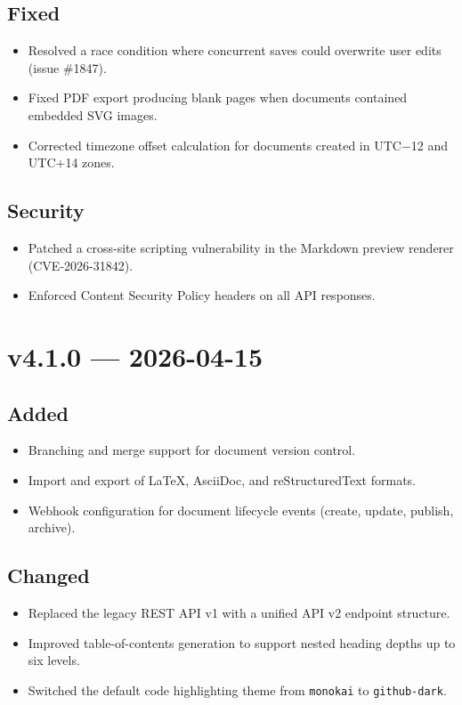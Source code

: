 \documentclass[
    language=english,
    doctype=article,
    institution=none,
]{../../omnilatex}
\begin{document}
\subsection{Fixed}
\begin{itemize}
    \item Resolved a race condition where concurrent saves could overwrite
          user edits (issue \#1847).
    \item Fixed PDF export producing blank pages when documents contained
          embedded SVG images.
    \item Corrected timezone offset calculation for documents created in
          UTC$-$12 and UTC$+$14 zones.
\end{itemize}

\subsection{Security}
\begin{itemize}
    \item Patched a cross-site scripting vulnerability in the Markdown
          preview renderer (CVE-2026-31842).
    \item Enforced Content Security Policy headers on all API responses.
\end{itemize}

\section{v4.1.0 --- 2026-04-15}

\subsection{Added}
\begin{itemize}
    \item Branching and merge support for document version control.
    \item Import and export of LaTeX, AsciiDoc, and reStructuredText formats.
    \item Webhook configuration for document lifecycle events (create, update,
          publish, archive).
\end{itemize}

\subsection{Changed}
\begin{itemize}
    \item Replaced the legacy REST API v1 with a unified API v2 endpoint
          structure.
    \item Improved table-of-contents generation to support nested heading
          depths up to six levels.
    \item Switched the default code highlighting theme from
          \texttt{monokai} to \texttt{github-dark}.
\end{itemize}
\end{document}
